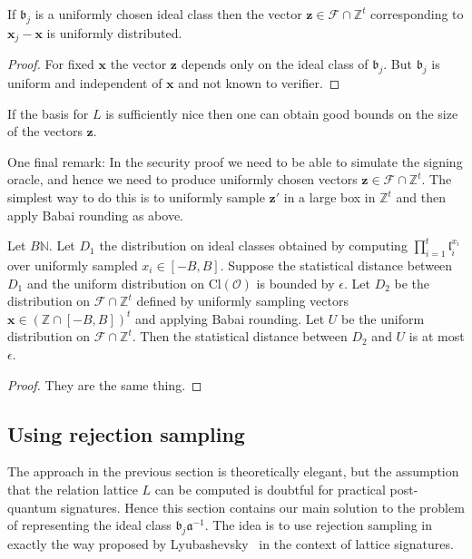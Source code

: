 \documentclass{llncs}
\newcommand{\FF}{\mathcal{F}}
\newcommand{\N}{\mathbb{N}}
\newcommand{\OO}{\mathcal{O}}
\newcommand{\Z}{\mathbb{Z}}
\newcommand{\Cl}{\text{Cl}}
\renewcommand{\a}{\mathfrak{a}}
\renewcommand{\b}{\mathfrak{b}}
\renewcommand{\l}{\mathfrak{l}}
\newcommand{\e}{\textbf{x}}
\newcommand{\f}{\textbf{x}}
\newcommand{\x}{\textbf{x}}
\newcommand{\z}{\textbf{z}}
\begin{document}
\begin{lemma}
If $\b_j$ is a uniformly chosen ideal class then the vector 
$\z \in \FF \cap \Z^t$ corresponding to $\f_j - \e$ is uniformly distributed.
\end{lemma}

\begin{proof}
For fixed $\e$ the vector $\z$ depends only on the ideal class of $\b_j$.
But $\b_j$ is uniform and independent of $\e$ and not known to verifier.
\end{proof}



If the basis for $L$ is sufficiently nice then one can obtain good bounds on the size of the vectors $\z$.

One final remark: In the security proof we need to be able to simulate the signing oracle, and hence we need to produce uniformly chosen vectors $\z \in \FF \cap \Z^t$.
The simplest way to do this is to uniformly sample $\z'$ in a large box in $\Z^t$ and then apply Babai rounding as above.


\begin{lemma}
Let $B \N$. Let $D_1$ the distribution on ideal classes obtained by computing $\prod_{i=1}^t \l_i^{x_i}$ over uniformly sampled $x_i \in [-B,B]$.
Suppose the statistical distance between $D_1$ and the uniform distribution on $\Cl(\OO)$ is bounded by $\epsilon$.
Let $D_2$ be the distribution on $\FF \cap \Z^t$ defined by uniformly sampling vectors $\x \in (\Z \cap [-B,B])^t$ and applying Babai rounding.
Let $U$ be the uniform distribution on $\FF \cap \Z^t$.
Then the statistical distance between $D_2$ and $U$ is at most $\epsilon$.
\end{lemma}

\begin{proof}
They are the same thing.
\end{proof}




\subsection{Using rejection sampling}

The approach in the previous section is theoretically elegant, but the assumption that the relation lattice $L$ can be computed is doubtful for practical post-quantum signatures.
Hence this section contains our main solution to the problem of representing the ideal class $\b_j \a^{-1}$.
The idea is to use rejection sampling in exactly the way proposed by Lyubashevsky~\cite{Lyu09} in the context of lattice signatures.
\end{document}
